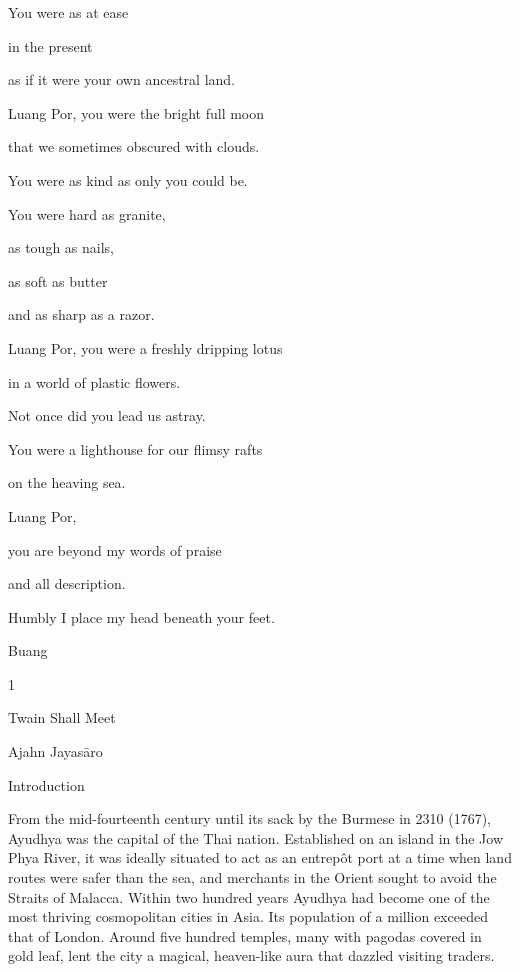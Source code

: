 You were as at ease

in the present

as if it were your own ancestral land.

Luang Por, you were the bright full moon

that we sometimes obscured with clouds.

You were as kind as only you could be.

You were hard as granite,

as tough as nails,

as soft as butter

and as sharp as a razor.

Luang Por, you were a freshly dripping lotus

in a world of plastic flowers.

Not once did you lead us astray.

You were a lighthouse for our flimsy rafts

on the heaving sea.

Luang Por,

you are beyond my words of praise

and all description.

Humbly I place my head beneath your feet.

Buang

1

Twain Shall Meet

Ajahn Jayasāro

Introduction

From the mid-fourteenth century until its sack by the Burmese in 2310
(1767), Ayudhya was the capital of the Thai nation. Established on an
island in the Jow Phya River, it was ideally situated to act as an
entrepôt port at a time when land routes were safer than the sea, and
merchants in the Orient sought to avoid the Straits of Malacca. Within
two hundred years Ayudhya had become one of the most thriving
cosmopolitan cities in Asia. Its population of a million exceeded that
of London. Around five hundred temples, many with pagodas covered in
gold leaf, lent the city a magical, heaven-like aura that dazzled
visiting traders.

